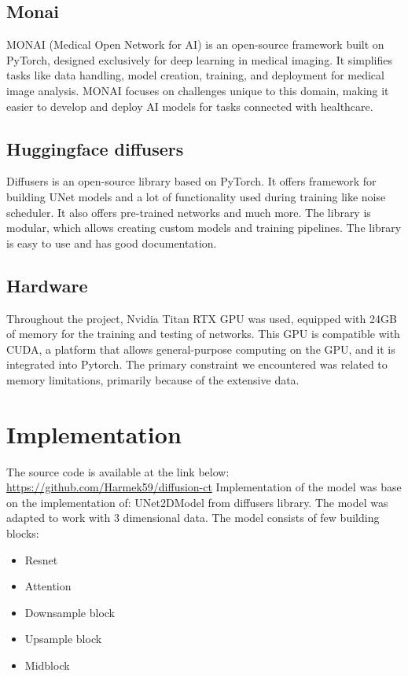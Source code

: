 \documentclass[11pt,a4paper]{report}
\begin{document}
\subsection{Monai}
MONAI (Medical Open Network for AI) is an open-source framework built on PyTorch, designed exclusively for deep learning in medical imaging. It simplifies tasks like data handling, model creation, training, and deployment for medical image analysis. MONAI focuses on challenges unique to this domain, making it easier to develop and deploy AI models for tasks connected with healthcare. \cite{Monai}
\subsection{Huggingface diffusers}
Diffusers is an open-source library based on PyTorch. It offers framework for building UNet models and a lot of functionality used during training like noise scheduler. It also offers pre-trained networks and much more. The library is modular, which allows creating custom models and training pipelines. The library is easy to use and has good documentation. \cite{Hf_diffusers}
\subsection{Hardware}
Throughout the project, Nvidia Titan RTX GPU was used, equipped with 24GB of memory for the training and testing of networks. This GPU is compatible with CUDA, a platform that allows general-purpose computing on the GPU, and it is integrated into Pytorch. The primary constraint we encountered was related to memory limitations, primarily because of the extensive data.
\section{Implementation}
The source code is available at the link below:
\newline
\url{https://github.com/Harmek59/diffusion-ct}
\newline
Implementation of the model was base on the implementation of: UNet2DModel from diffusers library. The model was adapted to work with 3 dimensional data.
The model consists of few building blocks:
\begin{itemize}
\item Resnet
\item Attention
\item Downsample block
\item Upsample block
\item Midblock
\end{itemize}
\end{document}
